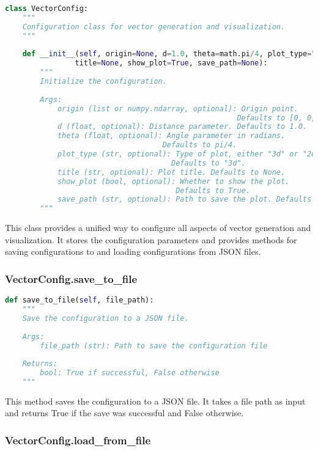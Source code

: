 \begin{lstlisting}[language=Python]
class VectorConfig:
    """
    Configuration class for vector generation and visualization.
    """
    
    def __init__(self, origin=None, d=1.0, theta=math.pi/4, plot_type="3d", 
                title=None, show_plot=True, save_path=None):
        """
        Initialize the configuration.
        
        Args:
            origin (list or numpy.ndarray, optional): Origin point. 
                                                     Defaults to [0, 0, 0].
            d (float, optional): Distance parameter. Defaults to 1.0.
            theta (float, optional): Angle parameter in radians. 
                                    Defaults to pi/4.
            plot_type (str, optional): Type of plot, either "3d" or "2d". 
                                      Defaults to "3d".
            title (str, optional): Plot title. Defaults to None.
            show_plot (bool, optional): Whether to show the plot. 
                                       Defaults to True.
            save_path (str, optional): Path to save the plot. Defaults to None.
        """
\end{lstlisting}

This class provides a unified way to configure all aspects of vector generation and visualization. It stores the configuration parameters and provides methods for saving configurations to and loading configurations from JSON files.

\subsubsection{VectorConfig.save\_to\_file}

\begin{lstlisting}[language=Python]
def save_to_file(self, file_path):
    """
    Save the configuration to a JSON file.
    
    Args:
        file_path (str): Path to save the configuration file
        
    Returns:
        bool: True if successful, False otherwise
    """
\end{lstlisting}

This method saves the configuration to a JSON file. It takes a file path as input and returns True if the save was successful and False otherwise.

\subsubsection{VectorConfig.load\_from\_file}

